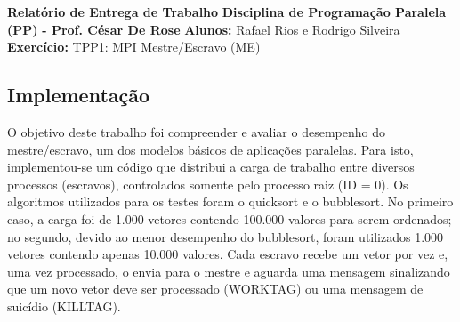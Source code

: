 \documentclass{article}
\begin{document}
\textbf{Relatório de Entrega de Trabalho} \newline
\textbf{Disciplina de Programação Paralela (PP)}\textbf{ - Prof. César De Rose} \newline
\textbf{Alunos:} Rafael Rios e Rodrigo Silveira \newline
\textbf{Exercício:} TPP1: MPI Mestre/Escravo (ME) \newline

\begin{multicols*}{2}

\section{Implementação}
O objetivo deste trabalho foi compreender e avaliar o desempenho do mestre/escravo, um dos modelos básicos de aplicações paralelas. Para isto, implementou-se um código que distribui a carga de trabalho entre diversos processos (escravos), controlados somente pelo processo raiz (ID = 0). Os algoritmos utilizados para os testes foram o quicksort e o bubblesort. No primeiro caso, a carga foi de 1.000 vetores contendo 100.000 valores para serem ordenados; no segundo, devido ao menor desempenho do bubblesort, foram utilizados 1.000 vetores contendo apenas 10.000 valores. Cada escravo recebe um vetor por vez e, uma vez processado, o envia para o mestre e aguarda uma mensagem sinalizando que um novo vetor deve ser processado (WORKTAG) ou uma mensagem de suicídio (KILLTAG). \newline

\end{multicols*}
\end{document}
